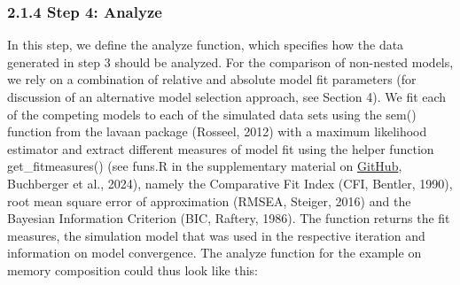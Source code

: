 \documentclass[
  man,floatsintext]{apa6}
\newenvironment{Shaded}{\begin{snugshade}}{\end{snugshade}}
\newcommand{\AttributeTok}[1]{\textcolor[rgb]{0.77,0.63,0.00}{#1}}
\newcommand{\ConstantTok}[1]{\textcolor[rgb]{0.00,0.00,0.00}{#1}}
\newcommand{\ControlFlowTok}[1]{\textcolor[rgb]{0.13,0.29,0.53}{\textbf{#1}}}
\newcommand{\FunctionTok}[1]{\textcolor[rgb]{0.00,0.00,0.00}{#1}}
\newcommand{\NormalTok}[1]{#1}
\newcommand{\OtherTok}[1]{\textcolor[rgb]{0.56,0.35,0.01}{#1}}
\newcommand{\SpecialCharTok}[1]{\textcolor[rgb]{0.00,0.00,0.00}{#1}}
\begin{document}
\hypertarget{step-4-analyze}{%
\subsubsection{2.1.4 Step 4: Analyze}\label{step-4-analyze}}

In this step, we define the analyze function, which specifies how the data generated in step 3 should be analyzed. For the comparison of non-nested models, we rely on a combination of relative and absolute model fit parameters (for discussion of an alternative model selection approach, see Section 4). We fit each of the competing models to each of the simulated data sets using the sem() function from the lavaan package (Rosseel, 2012) with a maximum likelihood estimator and extract different measures of model fit using the helper function get\_fitmeasures() (see funs.R in the supplementary material on \href{https://github.com/ebuchberger/Estimating-Power-for-SEM}{GitHub}, Buchberger et al., 2024), namely the Comparative Fit Index (CFI, Bentler, 1990), root mean square error of approximation (RMSEA, Steiger, 2016) and the Bayesian Information Criterion (BIC, Raftery, 1986). The function returns the fit measures, the simulation model that was used in the respective iteration and information on model convergence. The analyze function for the example on memory composition could thus look like this:

\begin{Shaded}
\end{Shaded}
\end{document}
